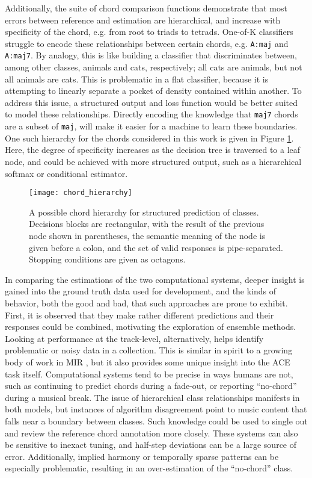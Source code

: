 Additionally, the suite of chord comparison functions demonstrate that most errors between reference and estimation are hierarchical, and increase with specificity of the chord, e.g. from root to triads to tetrads.
One-of-K classifiers struggle to encode these relationships between certain chords, e.g. \texttt{A:maj} and \texttt{A:maj7}.
By analogy, this is like building a classifier that discriminates between, among other classes, animals and cats, respectively; all cats are animals, but not all animals are cats.
This is problematic in a flat classifier, because it is attempting to linearly separate a pocket of density contained within another.
To address this issue, a structured output and loss function would be better suited to model these relationships.
Directly encoding the knowledge that \texttt{maj7} chords are a subset of \texttt{maj}, will make it easier for a machine to learn these boundaries.
One such hierarchy for the chords considered in this work is given in Figure \ref{fig:chord_hierarchy}.
Here, the degree of specificity increases as the decision tree is traversed to a leaf node, and could be achieved with more structured output, such as a hierarchical softmax or conditional estimator.


\begin{figure}[t!]
\centering
\texttt{[image: chord\_hierarchy]}
\caption{A possible chord hierarchy for structured prediction of classes. Decisions blocks are rectangular, with the result of the previous node shown in parentheses, the semantic meaning of the node is given before a colon, and the set of valid responses is pipe-separated. Stopping conditions are given as octagons.}
\label{fig:chord_hierarchy}
\end{figure}


In comparing the estimations of the two computational systems, deeper insight is gained into the ground truth data used for development, and the kinds of behavior, both the good and bad, that such approaches are prone to exhibit.
First, it is observed that they make rather different predictions and their responses could be combined, motivating the exploration of ensemble methods.
Looking at performance at the track-level, alternatively, helps identify problematic or noisy data in a collection.
This is similar in spirit to a growing body of work in MIR \cite{Zapata2012Assigning}, but it also provides some unique insight into the ACE task itself.
Computational systems tend to be precise in ways humans are not, such as continuing to predict chords during a fade-out, or reporting ``no-chord'' during a musical break.
The issue of hierarchical class relationships manifests in both models, but instances of algorithm disagreement point to music content that falls near a boundary between classes.
Such knowledge could be used to single out and review the reference chord annotation more closely.
These systems can also be sensitive to inexact tuning, and half-step deviations can be a large source of error.
Additionally, implied harmony or temporally sparse patterns can be especially problematic, resulting in an over-estimation of the ``no-chord'' class.


